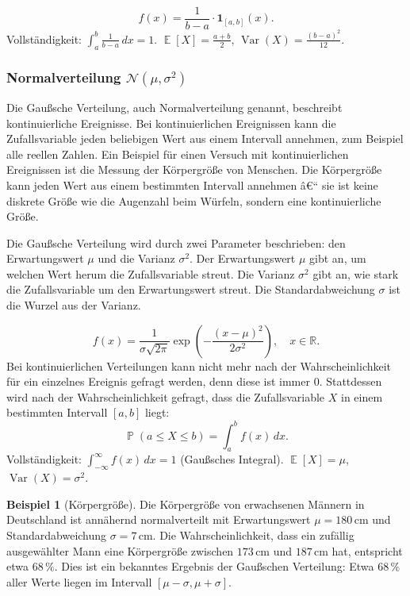 ﻿\documentclass[12pt,a4paper]{article}
\theoremstyle{definition}
\newtheorem{beispiel}{Beispiel}[section]
\theoremstyle{plain}
\theoremstyle{remark}
\DeclareMathOperator{\E}{\mathbb{E}}
\DeclareMathOperator{\Var}{Var}
\DeclareMathOperator{\Prob}{\mathbb{P}}
\begin{document}
\[
  f(x) = \frac{1}{b-a} \cdot \mathbf{1}_{[a,b]}(x).
\]
Vollständigkeit: $\int_a^b \frac{1}{b-a}\,dx = 1$.
$\E[X] = \frac{a+b}{2}$, $\Var(X) = \frac{(b-a)^2}{12}$.

\subsubsection{Normalverteilung $\mathcal{N}(\mu, \sigma^2)$}

Die Gaußsche Verteilung, auch Normalverteilung genannt, beschreibt
kontinuierliche Ereignisse. Bei kontinuierlichen Ereignissen kann die
Zufallsvariable jeden beliebigen Wert aus einem Intervall annehmen, zum
Beispiel alle reellen Zahlen. Ein Beispiel für einen Versuch mit
kontinuierlichen Ereignissen ist die Messung der Körpergröße von Menschen.
Die Körpergröße kann jeden Wert aus einem bestimmten Intervall annehmen â€“
sie ist keine diskrete Größe wie die Augenzahl beim Würfeln, sondern eine
kontinuierliche Größe.

Die Gaußsche Verteilung wird durch zwei Parameter beschrieben: den
Erwartungswert $\mu$ und die Varianz $\sigma^2$. Der Erwartungswert $\mu$
gibt an, um welchen Wert herum die Zufallsvariable streut. Die Varianz
$\sigma^2$ gibt an, wie stark die Zufallsvariable um den Erwartungswert
streut. Die Standardabweichung $\sigma$ ist die Wurzel aus der Varianz.

\[
  f(x) = \frac{1}{\sigma\sqrt{2\pi}}
  \exp\!\left(-\frac{(x-\mu)^2}{2\sigma^2}\right), \quad x \in \mathbb{R}.
\]
Bei kontinuierlichen Verteilungen kann nicht mehr nach der Wahrscheinlichkeit
für ein einzelnes Ereignis gefragt werden, denn diese ist immer $0$. Stattdessen
wird nach der Wahrscheinlichkeit gefragt, dass die Zufallsvariable $X$ in
einem bestimmten Intervall $[a, b]$ liegt:
\[
  \Prob(a \le X \le b) = \int_a^b f(x)\,dx.
\]
Vollständigkeit: $\int_{-\infty}^{\infty} f(x)\,dx = 1$ (Gaußsches Integral).
$\E[X] = \mu$, $\Var(X) = \sigma^2$.

\begin{beispiel}[Körpergröße]\label{bsp:koerpergroesse}
  Die Körpergröße von erwachsenen Männern in Deutschland ist annähernd
  normalverteilt mit Erwartungswert $\mu = 180$\,cm und Standardabweichung
  $\sigma = 7$\,cm. Die Wahrscheinlichkeit, dass ein zufällig ausgewählter
  Mann eine Körpergröße zwischen $173$\,cm und $187$\,cm hat, entspricht
  etwa $68\,\%$. Dies ist ein bekanntes Ergebnis der Gaußschen Verteilung:
  Etwa $68\,\%$ aller Werte liegen im Intervall $[\mu - \sigma, \mu +
  \sigma]$.
\end{beispiel}
\end{document}
